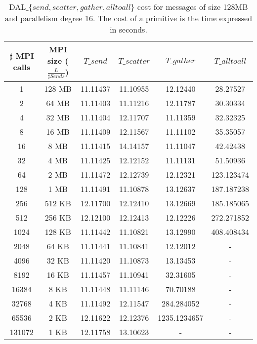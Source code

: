 \begin{table}[h]
\begin{center}
\begin{tabular}{|c|c|c|c|c|c|}\hline
\hline
$\sharp$ MPI calls & MPI size ($\frac{L}{\sharp Sends}$)  & $T\_send$   & $T\_scatter$  & $T\_gather$ & $T\_alltoall$      \\\hline\hline
1 & 128 MB & 11.11437 & 11.10955 & 12.12440 & 28.27527 \\\hline
2 & 64 MB & 11.11403 & 11.11216 & 12.11787 & 30.30334 \\\hline
4 & 32 MB & 11.11404 & 12.11707 & 11.11359 & 32.32325 \\\hline
8 & 16 MB & 11.11409 & 12.11567 & 11.11102 & 35.35057 \\\hline
16 & 8 MB & 11.11415 & 14.14157 & 11.11047 & 42.42438 \\\hline
32 & 4 MB & 11.11425 & 12.12152 & 11.11131 & 51.50936 \\\hline
64 & 2 MB & 11.11472 & 12.12739 & 12.12321 & 123.123474 \\\hline
128 & 1 MB & 11.11491 & 11.10878 & 13.12637 & 187.187238 \\\hline
256 & 512 KB & 12.11700 & 12.12410 & 13.12669 & 185.185065 \\\hline
512 & 256 KB & 12.12100 & 12.12413 & 12.12226 & 272.271852 \\\hline
1024 & 128 KB & 11.11442 & 11.10821 & 13.12990 & 408.408434 \\\hline
2048 & 64 KB & 11.11441 & 11.10841 & 12.12012 & - \\\hline
4096 & 32 KB & 11.11420 & 11.10873 & 13.13453 & - \\\hline
8192 & 16 KB & 11.11457 & 11.10941 & 32.31605 & - \\\hline
16384 & 8 KB & 11.11448 & 11.11146 & 70.70188 & - \\\hline
32768 & 4 KB & 11.11492 & 12.11547 & 284.284052 & - \\\hline
65536 & 2 KB & 12.11622 & 12.12376 & 1235.1234657 & - \\\hline
131072 & 1 KB & 12.11758 & 13.10623 & - & - \\\hline
\end{tabular}
\caption{DAL$\_\lbrace send, scatter, gather, alltoall \rbrace$ cost for messages of size 128MB and parallelism degree 16. The cost of a primitive is the time expressed in seconds.}
\label{tsetup-pianosa-n16-M128}
\end{center}
\end{table}